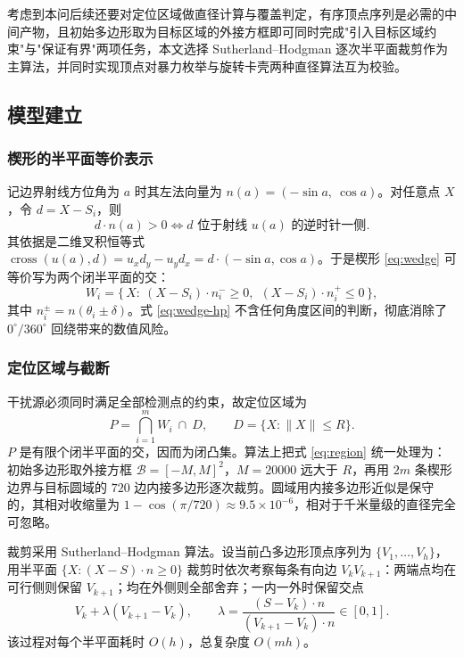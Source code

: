 \documentclass[12pt,a4paper]{ctexart}
\begin{document}
考虑到本问后续还要对定位区域做直径计算与覆盖判定，有序顶点序列是必需的中间产物，且初始多边形取为目标区域的外接方框即可同时完成"引入目标区域约束"与"保证有界"两项任务，本文选择 Sutherland--Hodgman 逐次半平面裁剪作为主算法，并同时实现顶点对暴力枚举与旋转卡壳两种直径算法互为校验。

\subsection{模型建立}

\subsubsection{楔形的半平面等价表示}

记边界射线方位角为 $a$ 时其左法向量为 $n(a)=(-\sin a,\ \cos a)$。对任意点 $X$，令 $d=X-S_i$，则
\begin{equation}
d\cdot n(a)>0\iff \text{$d$ 位于射线 $u(a)$ 的逆时针一侧}.
\label{eq:halfplane}
\end{equation}
其依据是二维叉积恒等式 $\operatorname{cross}(u(a),d)=u_xd_y-u_yd_x=d\cdot(-\sin a,\cos a)$。于是楔形 \eqref{eq:wedge} 可等价写为两个闭半平面的交：
\begin{equation}
W_i=\bigl\{\,X:\ (X-S_i)\cdot n_i^{-}\ge 0,\ \ (X-S_i)\cdot n_i^{+}\le 0\,\bigr\},
\label{eq:wedge-hp}
\end{equation}
其中 $n_i^{\pm}=n(\theta_i\pm\delta)$。式 \eqref{eq:wedge-hp} 不含任何角度区间的判断，彻底消除了 $0^\circ/360^\circ$ 回绕带来的数值风险。

\subsubsection{定位区域与截断}

干扰源必须同时满足全部检测点的约束，故定位区域为
\begin{equation}
P=\bigcap_{i=1}^{m}W_i\ \cap\ D,
\qquad D=\{X:\lVert X\rVert\le R\}.
\label{eq:region}
\end{equation}
$P$ 是有限个闭半平面的交，因而为闭凸集。算法上把式 \eqref{eq:region} 统一处理为：初始多边形取外接方框 $\mathcal B=[-M,M]^2$，$M=20000$ 远大于 $R$，再用 $2m$ 条楔形边界与目标圆域的 $720$ 边内接多边形逐次裁剪。圆域用内接多边形近似是保守的，其相对收缩量为 $1-\cos(\pi/720)\approx9.5\times10^{-6}$，相对于千米量级的直径完全可忽略。

裁剪采用 Sutherland--Hodgman 算法。设当前凸多边形顶点序列为 $\{V_1,\dots,V_h\}$，用半平面 $\{X:(X-S)\cdot n\ge 0\}$ 裁剪时依次考察每条有向边 $V_kV_{k+1}$：两端点均在可行侧则保留 $V_{k+1}$；均在外侧则全部舍弃；一内一外时保留交点
\begin{equation}
V_k+\lambda(V_{k+1}-V_k),\qquad
\lambda=\frac{(S-V_k)\cdot n}{(V_{k+1}-V_k)\cdot n}\in[0,1].
\label{eq:clip}
\end{equation}
该过程对每个半平面耗时 $O(h)$，总复杂度 $O(mh)$。
\end{document}
